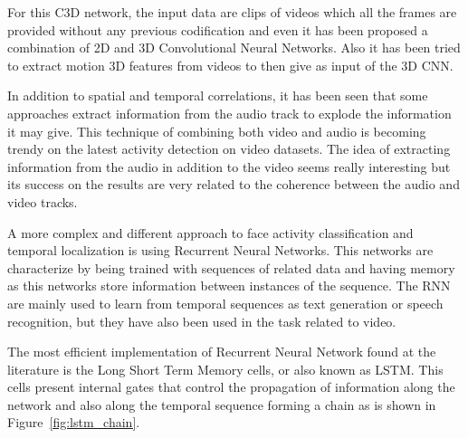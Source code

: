 For this C3D network, the input data are clips of videos which all the frames are provided without any previous codification and even it has been proposed a combination of 2D and 3D Convolutional Neural Networks\cite{Ng_2015_CVPR}\cite{yao2015describing}. Also it has been tried to extract motion 3D features from videos to then give as input of the 3D CNN\cite{yao2015describing}. 




In addition to spatial and temporal correlations, it has been seen that some approaches extract information from the audio track to explode the information it may give. This technique of combining both video and audio is becoming trendy on the latest activity detection on video datasets\cite{xu2015uts}. The idea of extracting information from the audio in addition to the video seems really interesting but its success on the results are very related to the coherence between the audio and video tracks. 

A more complex and different approach to face activity classification and temporal localization is using Recurrent Neural Networks. This networks are characterize by being trained with sequences of related data and having memory as this networks store information between instances of the sequence. The RNN are mainly used to learn from temporal sequences as text generation or speech recognition, but they have also been used in the task related to video.

The most efficient implementation of Recurrent Neural Network found at the literature is the Long Short Term Memory cells\cite{hochreiter1997long}, or also known as LSTM. This cells present internal gates that control the propagation of information along the network and also along the temporal sequence forming a chain as is shown in Figure~\ref{fig:lstm_chain}.

